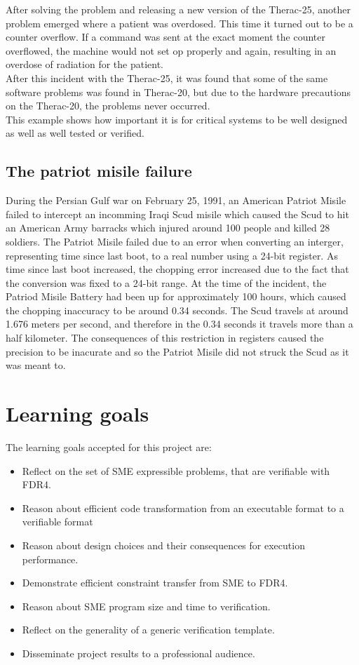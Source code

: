 \documentclass[a4paper]{report}
\begin{document}
After solving the problem and releasing a new version of the Therac-25, another problem emerged where a patient was overdosed. This time it turned out to be a counter overflow. If a command was sent at the exact moment the counter overflowed, the machine would not set op properly and again, resulting in an overdose of radiation for the patient. \\
After this incident with the Therac-25, it was found that some of the same software problems was found in Therac-20, but due to the hardware precautions on the Therac-20, the problems never occurred.
\\ This example shows how important it is for critical systems to be well designed as well as well tested or verified.

\subsection{The patriot misile failure}
During the Persian Gulf war on February 25, 1991, an American Patriot Misile failed to intercept an incomming Iraqi Scud misile which caused the Scud to hit an American Army barracks which injured around 100 people and killed 28 soldiers. The Patriot Misile failed due to an error when converting an interger, representing time since last boot, to a real number using a 24-bit register. As time since last boot increased, the chopping error increased due to the fact that the conversion was fixed to a 24-bit range. At the time of the incident, the Patriod Misile Battery had been up for approximately 100 hours, which caused the chopping inaccuracy to be around 0.34 seconds. The Scud travels at around 1.676 meters per second, and therefore in the 0.34 seconds it travels more than a half kilometer. The consequences of this restriction in  registers caused the precision to be inacurate and so the Patriot Misile did not struck the Scud as it was meant to.


\section{Learning goals}
The learning goals accepted for this project are:
\begin{itemize}
\item Reflect on the set of SME expressible problems, that are verifiable with FDR4.
\item Reason about efficient code transformation from an executable format to a verifiable format
\item Reason about design choices and their consequences for execution performance.
\item Demonstrate efficient constraint transfer from SME to FDR4.
\item Reason about SME program size and time to verification.
\item Reflect on the generality of a generic verification template.
\item Disseminate project results to a professional audience.
\end{itemize}
\end{document}
